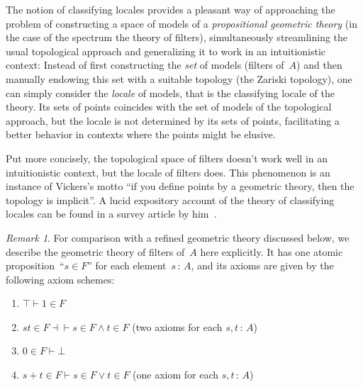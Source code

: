 \documentclass[10pt,reqno,a4paper]{amsbook}
\theoremstyle{definition}
\theoremstyle{plain}
\theoremstyle{remark}
\newtheorem{rem}[defn]{Remark}
\newcommand{\?}{\,{:}\,}
\renewcommand{\_}{\mathpunct{.}\,}
\begin{document}
{The notion of classifying locales provides a pleasant way of approaching the
problem of constructing a space of models of a \emph{propositional geometric
theory} (in the case of the spectrum the theory of filters), simultaneously
streamlining the usual topological approach and generalizing it to work in an
intuitionistic context: Instead of first constructing the \emph{set} of models
(filters of~$A$) and then manually endowing this set with a suitable topology
(the Zariski topology), one can simply consider the \emph{locale} of models,
that is the classifying locale of the theory. Its sets of points coincides with
the set of models of the topological approach, but the locale is not determined
by its sets of points, facilitating a better behavior in contexts where the
points might be elusive.

Put more concisely, the topological space of filters doesn't work well in an
intuitionistic context, but the locale of filters does. This phenomenon is an
instance of Vickers's motto ``if you define points by a geometric theory, then
the topology is implicit''. A lucid expository account of the theory of
classifying locales can be found in a survey article by
him~\cite{vickers:locales-toposes}.

\begin{rem}\label{rem:theory-of-filters}
For comparison with a refined geometric theory discussed below, we describe the
geometric theory of filters of~$A$ here explicitly. It has one atomic
proposition~``$s \in F$'' for each element~$s \? A$, and its axioms are given by the
following axiom schemes:
\begin{enumerate}
\item $\top \vdash 1 \in F$
\item $st \in F \dashv\vdash s \in F \wedge t \in F$ (two axioms for each $s,t\?A$)
\item $0 \in F \vdash \bot$
\item $s+t \in F \vdash s \in F \vee t \in F$ (one axiom for each $s,t\?A$)
\end{enumerate}
\end{rem}


}
\end{document}
